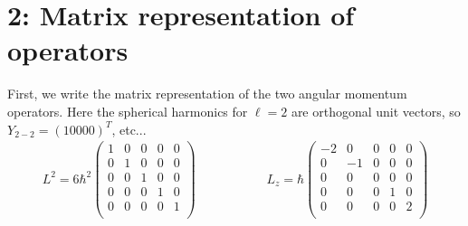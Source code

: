 \documentclass[10pt]{article} %
\begin{document}
\section{2: Matrix representation of operators}
First, we write the matrix representation of the two angular momentum operators. Here
the spherical harmonics for $\ell=2$ are orthogonal unit vectors, so $Y_{2-2}=(1 0 0 0 0)^T$, etc...\\

\begin{align*}
  L^2 =
  6\hbar^2\begin{pmatrix}
    1 & 0 & 0 & 0 & 0\\
    0 & 1 & 0 & 0 & 0\\
    0 & 0 & 1 & 0 & 0\\
    0 & 0 & 0 & 1 & 0\\
    0 & 0 & 0 & 0 & 1\\
  \end{pmatrix}&
  \hspace{2cm}
  L_z =
  \hbar\begin{pmatrix}
    -2 & 0 & 0 & 0 & 0\\
    0 & -1 & 0 & 0 & 0\\
    0 & 0 & 0 & 0 & 0\\
    0 & 0 & 0 & 1 & 0\\
    0 & 0 & 0 & 0 & 2\\
  \end{pmatrix}
\end{align*}
\end{document}
